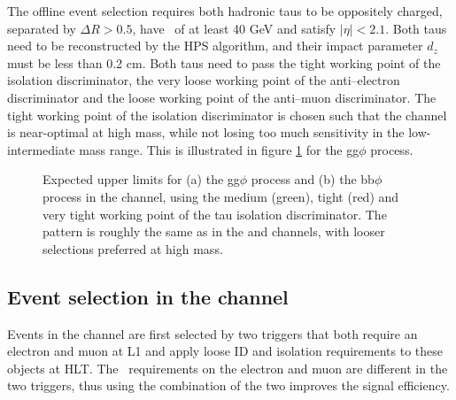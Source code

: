 The offline event selection requires both hadronic taus to be oppositely charged, separated
by $\Delta R > 0.5$, have \pT~of at least 40 GeV and satisfy $|\eta|<2.1$. Both taus need
to be reconstructed by the HPS algorithm, and their impact parameter $d_{z}$ must be less than 0.2 cm.
Both taus need to pass the tight working point of the isolation discriminator, the very loose 
working point of the anti--electron discriminator and the loose working point of the anti--muon discriminator. 
The tight working point of the isolation discriminator is chosen such that
the channel is near-optimal at high mass, while not losing too much sensitivity in the low-intermediate mass range.
This is illustrated in figure \ref{fig:mssm_tauid_tt} for the gg$\phi$ process.

\begin{figure}[h!]
\begin{center}
\end{center}
\caption{Expected upper limits for (a) the gg$\phi$ process and (b) the bb$\phi$ process 
in the \tautau channel, using the 
medium (green), tight (red) and very tight working point of the tau isolation discriminator.
The pattern is roughly the same as in the \etau and \mutau channels, with looser selections preferred at high
mass.}
\label{fig:mssm_tauid_tt}
\end{figure}

\subsection{\texorpdfstring{Event selection in the \emu channel}{Event selection in the e mu channel}}
\label{sec:mssm_eventsel_em}
Events in the \emu channel are first selected by two triggers
that both require an electron and muon at \ac{L1} and apply loose ID and
isolation requirements to these objects at \ac{HLT}. The \pT~requirements on
the electron and muon are different in the two triggers, thus using the combination of the two
improves the signal efficiency.

